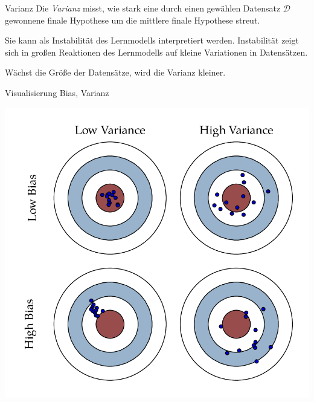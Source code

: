 \begin{defi}{Varianz}
    Die \emph{Varianz} misst, wie stark eine durch einen gewählen Datensatz $\mathcal{D}$ gewonnene finale Hypothese um die mittlere finale Hypothese streut.

    Sie kann als Instabilität des Lernmodells interpretiert werden.
    Instabilität zeigt sich in großen Reaktionen des Lernmodells auf kleine Variationen in Datensätzen.

    Wächst die Größe der Datensätze, wird die Varianz kleiner.
\end{defi}

\begin{bonus}{Visualisierung Bias, Varianz}
    \begin{center}
        \includegraphics[width=.7\textwidth]{includes/figures/bonus_defi_variance.png}
    \end{center}
\end{bonus}

